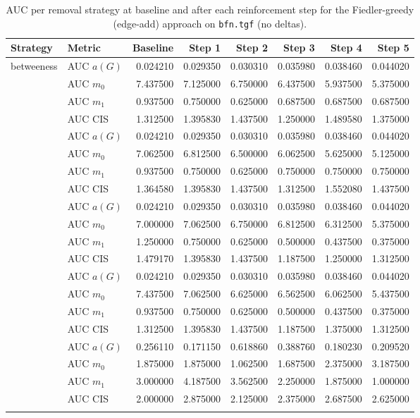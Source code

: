 \begin{table}[htbp]
  \centering
  \caption{AUC per removal strategy at baseline and after each reinforcement step for the Fiedler-greedy (edge-add) approach on \texttt{bfn.tgf} (no deltas).}
  \label{tab:bfn-fiedler_greedy-auc}
  \begin{tabular}{llrrrrrr}
    \toprule
    \textbf{Strategy} & \textbf{Metric} & \textbf{Baseline} & \textbf{Step 1} & \textbf{Step 2} & \textbf{Step 3} & \textbf{Step 4} & \textbf{Step 5} \\
    \midrule
    \multirow{4}{*}{betweeness} & AUC $a(G)$ & 0.024210 & 0.029350 & 0.030310 & 0.035980 & 0.038460 & 0.044020 \\
    & AUC $m_0$ & 7.437500 & 7.125000 & 6.750000 & 6.437500 & 5.937500 & 5.375000 \\
    & AUC $m_1$ & 0.937500 & 0.750000 & 0.625000 & 0.687500 & 0.687500 & 0.687500 \\
    & AUC CIS & 1.312500 & 1.395830 & 1.437500 & 1.250000 & 1.489580 & 1.375000 \\
    \addlinespace
    \multirow{4}{*}{closeness} & AUC $a(G)$ & 0.024210 & 0.029350 & 0.030310 & 0.035980 & 0.038460 & 0.044020 \\
    & AUC $m_0$ & 7.062500 & 6.812500 & 6.500000 & 6.062500 & 5.625000 & 5.125000 \\
    & AUC $m_1$ & 0.937500 & 0.750000 & 0.625000 & 0.750000 & 0.750000 & 0.750000 \\
    & AUC CIS & 1.364580 & 1.395830 & 1.437500 & 1.312500 & 1.552080 & 1.437500 \\
    \addlinespace
    \multirow{4}{*}{core influence} & AUC $a(G)$ & 0.024210 & 0.029350 & 0.030310 & 0.035980 & 0.038460 & 0.044020 \\
    & AUC $m_0$ & 7.000000 & 7.062500 & 6.750000 & 6.812500 & 6.312500 & 5.375000 \\
    & AUC $m_1$ & 1.250000 & 0.750000 & 0.625000 & 0.500000 & 0.437500 & 0.375000 \\
    & AUC CIS & 1.479170 & 1.395830 & 1.437500 & 1.187500 & 1.250000 & 1.312500 \\
    \addlinespace
    \multirow{4}{*}{degree} & AUC $a(G)$ & 0.024210 & 0.029350 & 0.030310 & 0.035980 & 0.038460 & 0.044020 \\
    & AUC $m_0$ & 7.437500 & 7.062500 & 6.625000 & 6.562500 & 6.062500 & 5.437500 \\
    & AUC $m_1$ & 0.937500 & 0.750000 & 0.625000 & 0.500000 & 0.437500 & 0.375000 \\
    & AUC CIS & 1.312500 & 1.395830 & 1.437500 & 1.187500 & 1.375000 & 1.312500 \\
    \addlinespace
    \multirow{4}{*}{random} & AUC $a(G)$ & 0.256110 & 0.171150 & 0.618860 & 0.388760 & 0.180230 & 0.209520 \\
    & AUC $m_0$ & 1.875000 & 1.875000 & 1.062500 & 1.687500 & 2.375000 & 3.187500 \\
    & AUC $m_1$ & 3.000000 & 4.187500 & 3.562500 & 2.250000 & 1.875000 & 1.000000 \\
    & AUC CIS & 2.000000 & 2.875000 & 2.125000 & 2.375000 & 2.687500 & 2.625000 \\
    \addlinespace
    \bottomrule
  \end{tabular}
\end{table}
